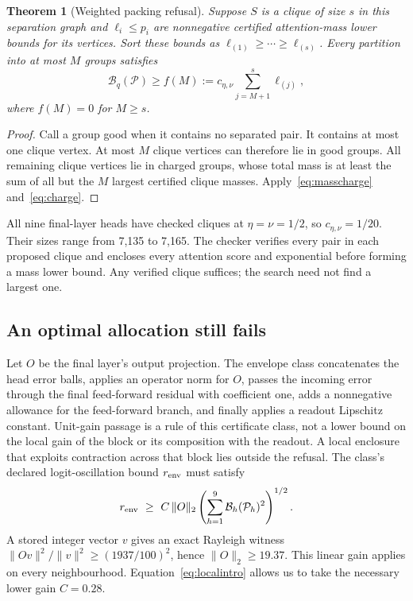 \documentclass[10pt]{article}
\newtheorem{theorem}{Theorem}
\theoremstyle{definition}\newtheorem{definition}[theorem]{Definition}
\newcommand{\B}{\mathcal B}
\newcommand{\Pcal}{\mathcal P}
\begin{document}
\begin{theorem}[Weighted packing refusal]\label{thm:packing}
Suppose $S$ is a clique of size $s$ in this separation graph and $\ell_i\leq p_i$ are nonnegative certified attention-mass lower bounds for its vertices. Sort these bounds as $\ell_{(1)}\geq\cdots\geq\ell_{(s)}$. Every partition into at most $M$ groups satisfies
\begin{equation}\label{eq:packing}
 \B_q(\Pcal)\geq f(M):=
 c_{\eta,\nu}\sum_{j=M+1}^{s}\ell_{(j)},
\end{equation}
where $f(M)=0$ for $M\geq s$.
\end{theorem}
\begin{proof}
Call a group good when it contains no separated pair. It contains at most one clique vertex. At most $M$ clique vertices can therefore lie in good groups. All remaining clique vertices lie in charged groups, whose total mass is at least the sum of all but the $M$ largest certified clique masses. Apply~\eqref{eq:masscharge} and~\eqref{eq:charge}.
\end{proof}

All nine final-layer heads have checked cliques at $\eta=\nu=1/2$, so $c_{\eta,\nu}=1/20$. Their sizes range from 7,135 to 7,165. The checker verifies every pair in each proposed clique and encloses every attention score and exponential before forming a mass lower bound. Any verified clique suffices; the search need not find a largest one.

\subsection{An optimal allocation still fails}
Let $O$ be the final layer's output projection. The envelope class concatenates the head error balls, applies an operator norm for $O$, passes the incoming error through the final feed-forward residual with coefficient one, adds a nonnegative allowance for the feed-forward branch, and finally applies a readout Lipschitz constant. Unit-gain passage is a rule of this certificate class, not a lower bound on the local gain of the block or its composition with the readout. A local enclosure that exploits contraction across that block lies outside the refusal. The class's declared logit-oscillation bound $r_{\rm env}$ must satisfy
\begin{equation}\label{eq:composition}
 r_{\rm env}\ \geq\ C\,\|O\|_2
             \left(\sum_{h=1}^{9}\B_h(\Pcal_h)^2\right)^{1/2}.
\end{equation}
A stored integer vector $v$ gives an exact Rayleigh witness
$\|Ov\|^2/\|v\|^2\geq(1937/100)^2$, hence $\|O\|_2\geq19.37$. This linear gain applies on every neighbourhood. Equation~\eqref{eq:localintro} allows us to take the necessary lower gain $C=0.28$.
\end{document}
